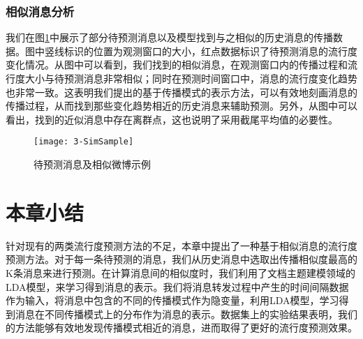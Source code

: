 \subsubsection{相似消息分析}
我们在图\ref{fig:simExample}中展示了部分待预测消息以及模型找到与之相似的历史消息的传播数据。图中竖线标识的位置为观测窗口的大小，红点数据标识了待预测消息的流行度变化情况。从图中可以看到，我们找到的相似消息，在观测窗口内的传播过程和流行度大小与待预测消息非常相似；同时在预测时间窗口中，消息的流行度变化趋势也非常一致。这表明我们提出的基于传播模式的表示方法，可以有效地刻画消息的传播过程，从而找到那些变化趋势相近的历史消息来辅助预测。另外，从图中可以看出，找到的近似消息中存在离群点，这也说明了采用截尾平均值的必要性。
\begin{figure}[!htbp]
  \centering
  \texttt{[image: 3-SimSample]}
  \caption{待预测消息及相似微博示例}
  \label{fig:simExample}
\end{figure}

\section{本章小结}
针对现有的两类流行度预测方法的不足，本章中提出了一种基于相似消息的流行度预测方法。对于每一条待预测的消息，我们从历史消息中选取出传播相似度最高的K条消息来进行预测。在计算消息间的相似度时，我们利用了文档主题建模领域的LDA模型，来学习得到消息的表示。我们将消息转发过程中产生的时间间隔数据作为输入，将消息中包含的不同的传播模式作为隐变量，利用LDA模型，学习得到消息在不同传播模式上的分布作为消息的表示。数据集上的实验结果表明，我们的方法能够有效地发现传播模式相近的消息，进而取得了更好的流行度预测效果。
